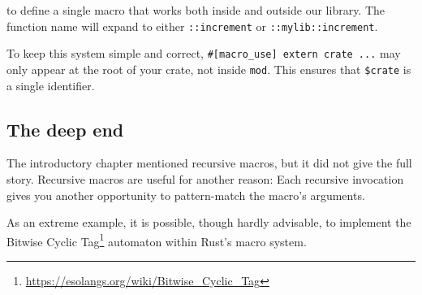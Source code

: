 \documentclass[a4paper,]{book}
\newenvironment{Shaded}{\begin{snugshade}}{\end{snugshade}}
\newcommand{\DecValTok}[1]{\textcolor[rgb]{0.00,0.00,0.81}{{#1}}}
\newcommand{\CommentTok}[1]{\textcolor[rgb]{0.56,0.35,0.01}{\textit{{#1}}}}
\newcommand{\PreprocessorTok}[1]{\textcolor[rgb]{0.56,0.35,0.01}{\textit{{#1}}}}
\newcommand{\NormalTok}[1]{{#1}}
\renewcommand{\href}[2]{#2\footnote{\url{#1}}}
\begin{document}
to define a single macro that works both inside and outside our library.
The function name will expand to either \texttt{::increment} or
\texttt{::mylib::increment}.

To keep this system simple and correct,
\texttt{\#{[}macro\_use{]}\ extern\ crate\ ...} may only appear at the
root of your crate, not inside \texttt{mod}. This ensures that
\texttt{\$crate} is a single identifier.

\subsection{The deep end}\label{the-deep-end}

The introductory chapter mentioned recursive macros, but it did not give
the full story. Recursive macros are useful for another reason: Each
recursive invocation gives you another opportunity to pattern-match the
macro's arguments.

As an extreme example, it is possible, though hardly advisable, to
implement the
\href{https://esolangs.org/wiki/Bitwise_Cyclic_Tag}{Bitwise Cyclic Tag}
automaton within Rust's macro system.

\begin{Shaded}
\end{Shaded}
\end{document}
